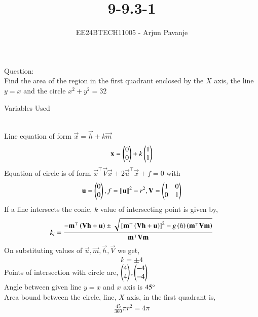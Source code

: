 \documentclass[journal]{IEEEtran}
\begin{document}

\vspace{3cm}
	
\title{9-9.3-1}
\author{EE24BTECH11005 - Arjun Pavanje}
{\let\newpage\relax\maketitle}
Question:\\
Find the area of the region in the first quadrant enclosed by the $X$ axis, the line $y=x$ and the circle $x^2+y^2=32$
\begin{table}[h!]    
  \centering
  
  \caption{Variables Used}
  \label{tab1-1.9-6}
\end{table}\\
\solution
Line equation of form $\vec{x}=\vec{h}+k\vec{m}$
\begin{align}
\mathbf{x}=\begin{pmatrix}0\\0\end{pmatrix}+k\begin{pmatrix}1\\1\end{pmatrix}
\end{align}
Equation of circle is of form $\vec{x}^{\top}\vec{V}\vec{x}+2\vec{u}^{\top}\vec{x}+f=0$ with
\begin{align}
	\mathbf{u}=\begin{pmatrix}0\\0\end{pmatrix},f=\left\lVert\mathbf{u}\right\rVert^2-r^2,\mathbf{V}=\begin{pmatrix}1&0\\0&1\end{pmatrix}
\end{align}
If a line intersects the conic, $k$ value of intersecting point is given by,
\begin{align}
	k_i=\frac{-\mathbf{m}^{\top}\left(\mathbf{Vh}+\mathbf{u}\right)\pm\sqrt{{}\left[\mathbf{m}^{\top}\left(\mathbf{Vh}+\mathbf{u}\right)\right]^2-g\left(h\right)\left(\mathbf{m}^{\top}\mathbf{Vm}\right)}}{\mathbf{m}^{\top}\mathbf{Vm}}
\end{align}
On substituting values of $\vec{u},\vec{m},\vec{h},\vec{V}$ we get,
\begin{align}
	k=\pm4
\end{align}
Points of intersection with circle are, $\begin{pmatrix}4\\4\end{pmatrix},\begin{pmatrix}-4\\-4\end{pmatrix}$\\
Angle between given line $y=x$ and $x$ axis is $45\degree$ \\
Area bound between the circle, line, $X$ axis, in the first quadrant is,
\begin{align}
	\frac{45}{360}\pi r^2
	=4\pi
\end{align}
\end{document}
